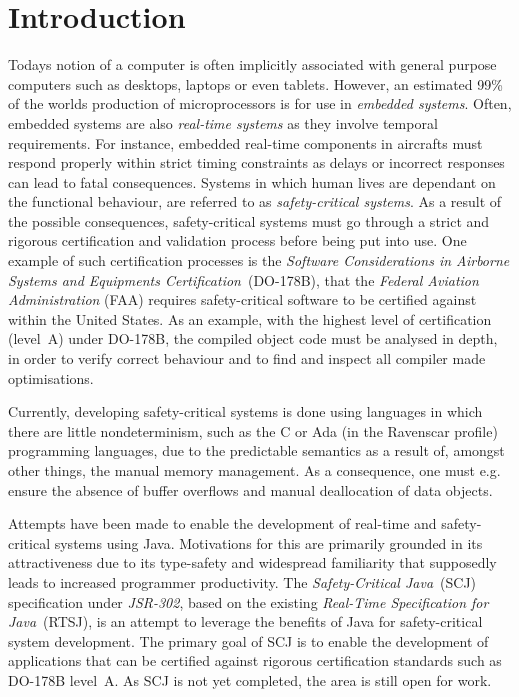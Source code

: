 \chapter{Introduction}
\label{chapter:introduction}
Todays notion of a computer is often implicitly associated with general purpose computers such as desktops, laptops or even tablets. However, an estimated 99\% of the worlds production of microprocessors is for use in \textit{embedded systems}\cite{alan2001real}. Often, embedded systems are also \textit{real-time systems} as they involve temporal requirements. For instance, embedded real-time components in aircrafts must respond properly within strict timing constraints as delays or incorrect responses can lead to fatal consequences. Systems in which human lives are dependant on the functional behaviour, are referred to as \textit{safety-critical systems}\cite{SCJSpec}. As a result of the possible consequences, safety-critical systems must go through a strict and rigorous certification and validation process before being put into use. One example of such certification processes is the \textit{Software Considerations in Airborne Systems and Equipments Certification}~(DO-178B)\cite{DO178B}, that the \textit{Federal Aviation Administration} (FAA) requires safety-critical software to be certified against within the United States. As an example, with the highest level of certification (level~A) under DO-178B, the compiled object code must be analysed in depth, in order to verify correct behaviour and to find and inspect all compiler made optimisations\cite{DO178B-Example}.
		
Currently, developing safety-critical systems is done using languages in which there are little nondeterminism, such as the C or Ada (in the Ravenscar profile) programming languages, due to the predictable semantics as a result of, amongst other things, the manual memory management. As a consequence, one must e.g. ensure the absence of buffer overflows and manual deallocation of data objects.

Attempts have been made to enable the development of real-time and safety-critical systems using Java. Motivations for this are primarily grounded in its attractiveness due to its type-safety and widespread familiarity that supposedly leads to increased programmer productivity\cite{henties:2009-20, Nilsen96issuesin}. The \textit{Safety-Critical Java}~(SCJ) specification under \textit{JSR-302}\cite{JSR, SCJSpec}, based on the existing \textit{Real-Time Specification for Java}~(RTSJ)\cite{RTSJSpec}, is an attempt to leverage the benefits of Java for safety-critical system development. The primary goal of SCJ is to enable the development of applications that can be certified against rigorous certification standards such as DO-178B level~A. As SCJ is not yet completed, the area is still open for work.

